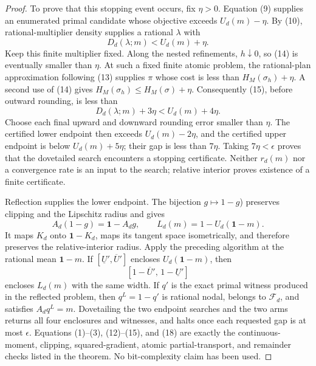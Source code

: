 \documentclass{article}
\begin{document}
\begin{proof}
To prove that this stopping event occurs, fix \(\eta>0\).  Equation (9)
supplies an enumerated primal candidate whose objective exceeds
\(U_d(m)-\eta\).  By (10), rational-multiplier density supplies a rational
\(\lambda\) with
\[
 D_d(\lambda;m)<U_d(m)+\eta.                                \tag{16}
\]
Keep this finite multiplier fixed.  Along the nested refinements,
\(h\downarrow0\), so (14) is eventually smaller than \(\eta\).  At such a
fixed finite atomic problem, the rational-plan approximation following (13)
supplies \(\pi\) whose cost is less than \(H_M(\sigma_h)+\eta\).  A second use
of (14) gives \(H_M(\sigma_h)\leq H_M(\sigma)+\eta\).  Consequently (15),
before outward rounding, is less than
\[
 D_d(\lambda;m)+3\eta<U_d(m)+4\eta.                         \tag{17}
\]
Choose each final upward and downward rounding error smaller than \(\eta\).
The certified lower endpoint then exceeds \(U_d(m)-2\eta\), and the certified
upper endpoint is below \(U_d(m)+5\eta\); their gap is less than \(7\eta\).
Taking \(7\eta<\epsilon\) proves that the dovetailed search encounters a
stopping certificate.  Neither \(r_d(m)\) nor a convergence rate is an input
to the search; relative interior proves existence of a finite certificate.

Reflection supplies the lower endpoint.  The bijection \(g\mapsto1-g\))
preserves clipping and the Lipschitz radius and gives
\[
 A_d(1-g)=\mathbf1-A_dg,
 \qquad
 L_d(m)=1-U_d(\mathbf1-m).                                  \tag{18}
\]
It maps \(K_d\) onto \(\mathbf1-K_d\), maps its tangent space isometrically,
and therefore preserves the relative-interior radius.  Apply the preceding
algorithm at the rational mean \(\mathbf1-m\).  If
\([\underline U',\overline U']\) encloses
\(U_d(\mathbf1-m)\), then
\[
 [1-\overline U',\,1-\underline U']                         \tag{19}
\]
encloses \(L_d(m)\) with the same width.  If \(q'\) is the exact primal
witness produced in the reflected problem, then \(q^L=1-q'\) is rational
nodal, belongs to \(\mathcal F_d\), and satisfies \(A_dq^L=m\).  Dovetailing
the two endpoint searches and the two arms returns all four enclosures and
witnesses, and halts once each requested gap is at most \(\epsilon\).
Equations (1)--(3), (12)--(15), and (18) are exactly the continuous-moment,
clipping, squared-gradient, atomic partial-transport, and remainder checks
listed in the theorem.  No bit-complexity claim has been used.


\end{proof}
\end{document}

